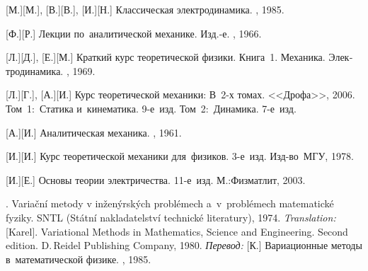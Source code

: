 \begin{thebibliography}{123}
\begin{otherlanguage}{russian}
[М.][М.], [В.][В.], [И.][Н.] Классическая электродинамика. \naukapublisher, 1985. 

[Ф.][Р.] Лекции по~аналитической механике. Изд.\hbox{-}е. \naukapublisher, 1966. 

[Л.][Д.], [Е.][М.] Краткий курс теоретической физики. Книга~1. Механика. Электродинамика. \naukapublisher, 1969. 

[Л.][Г.], [А.][И.] Курс теоретической механики: В~2\hbox{-}х томах. <<Дрофа>>, 2006.
Том~1:~Статика и~кинематика. 9\hbox{-}е~изд. 
Том~2:~Динамика. 7\hbox{-}е~изд. 

[А.][И.] Аналитическая механика. \fizmatgiz, 1961. 

[И.][И.] Курс теоретической механики для~физиков. 3\hbox{-}е~изд. Изд\hbox{-}во~МГУ, 1978. 

[И.][Е.] %
Основы теории электричества. 11\hbox{-}е~изд. М.:\;Физматлит, 2003.

%
%



. Varia\v{c}ní metody v in\v{z}en\'{y}rsk\'{y}ch probl\'{e}mech a~v~pro\-bl\'{e}\-mech matematick\'{e} fyziky. SNTL (St\'{a}tní nakladatelství technick\'{e} literatury), 1974. 
\emph{Translation:}
[Karel]. Variational Methods in Mathematics, Science and Engineering. Second edition. D.\,Reidel Publishing Company, 1980. 
\emph{Перевод:}
[К.] Вариационные методы в~математической физике. \mirpublisher, 1985. 


\end{otherlanguage}
\end{thebibliography}
